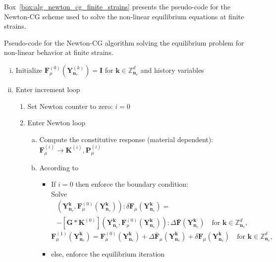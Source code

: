 Box~\ref{box:alg_newton_cg_finite_strains} presents the pseudo-code for the Newton-CG scheme used to solve the non-linear equilibrium equations at finite strains.

\begin{framedbox}[htb]
\caption{Pseudo-code for the Newton-CG algorithm solving the equilibrium problem for non-linear behavior at finite strains.}
\label{box:alg_newton_cg_finite_strains}
\begin{center}
\begin{minipage}{0.9\textwidth}
\begin{enumerate}[(i)]
\item Initialize \(\bm F_\mu^{(0)}\left(\bm Y^{(k)}_{\bm n_v}\right) = \bm I\) for \(\bm k \in \mathbb Z^d_{\bm n_v}\) and history variables
\item Enter increment loop
\begin{enumerate}[(1)]
  \item Set Newton counter to zero: \(i=0\)
  \item Enter Newton loop
  \begin{enumerate}[(a)]
    \item Compute the constitutive response (material dependent): \(\bm F_\mu^{(i)} \to \bm K^{(i)}, \bm P_\mu^{(i)}\)
    \item According to
    \begin{itemize}
      \item If \(i=0\) then enforce the boundary condition:\\
      Solve
      \begin{multline*}
      [\bm{G}* \bm{K}^{(0)}]\left(\bm Y_{\bm n_v}^{\bm  k}, \bm F_\mu^{(0)}\left(\bm Y_{\bm n_v}^{\bm  k}\right)\right): \delta \bm{F}_\mu\left(\bm Y_{\bm n_v}^{\bm  k}\right)=\\-[\bm{G}* \bm{K}^{(0)}]\left(\bm Y_{\bm n_v}^{\bm  k}, \bm F_\mu^{(0)}\left(\bm Y_{\bm n_v}^{\bm  k}\right)\right): \Delta \bar{\bm{F}}\left(\bm Y_{\bm n_v}^{\bm  k}\right)\quad \text{for \(\bm k \in \mathbb Z^d_{\bm n_v}\)},
      \end{multline*}
      \begin{equation*}
      {\bm{F}}_\mu^{(1)}\left(\bm Y_{\bm n_v}^{\bm  k}\right)={\bm{F}}_\mu^{(0)}\left(\bm Y_{\bm n_v}^{\bm  k}\right)+\Delta \bar{\bm{F}}_\mu\left(\bm Y_{\bm n_v}^{\bm  k}\right)+\delta {\bm{F}}_\mu\left(\bm Y_{\bm n_v}^{\bm  k}\right)\quad \text{for \(\bm k \in \mathbb Z^d_{\bm n_v}\)},
      \end{equation*}
      \item else, enforce the equilibrium iteration

\end{itemize}
\end{enumerate}
\end{enumerate}
\end{enumerate}
\end{minipage}
\end{center}
\end{framedbox}
